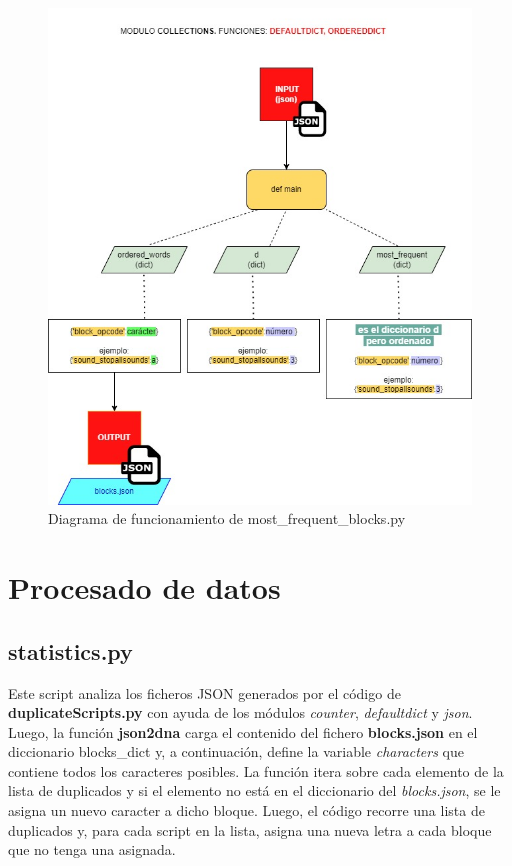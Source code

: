 \documentclass[a4paper, 12pt]{book}
\begin{document}
\begin{figure}[!htb]
  \centering
  \includegraphics[width=15cm, keepaspectratio]{img/flow_mostfreq.jpg}
  \caption{Diagrama de funcionamiento de most\_frequent\_blocks.py}
  \label{fig:flow_mostfreq}
\end{figure}

\newpage 

\section{Procesado de datos} 
\label{sec:procesadodatos}

\subsection{statistics.py}

Este script analiza los ficheros JSON generados por el código de \textbf{duplicateScripts.py} con ayuda de los módulos \textit{counter}, \textit{defaultdict} y \textit{json}. Luego, la función \textbf{json2dna} carga el contenido del fichero \textbf{blocks.json} en el diccionario blocks\_dict y, a continuación, define la variable \textit{characters} que contiene todos los caracteres posibles. La función itera sobre cada elemento de la lista de duplicados y si el elemento no está en el diccionario del \textit{blocks.json}, se le asigna un nuevo caracter a dicho bloque. Luego, el código recorre una lista de duplicados y, para cada script en la lista, asigna una nueva letra a cada bloque que no tenga una asignada.
\end{document}
